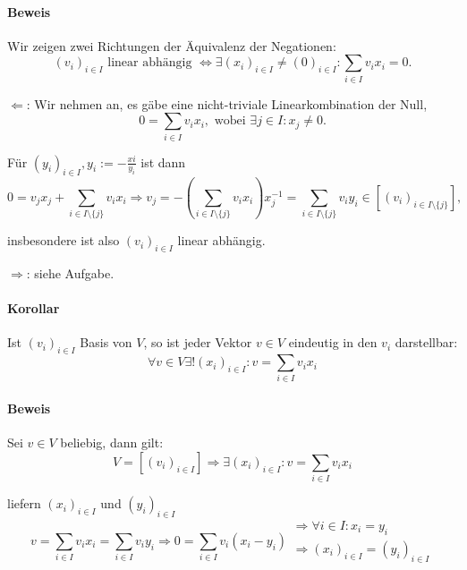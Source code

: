 \paragraph{Beweis}
	Wir zeigen zwei Richtungen der Äquivalenz der Negationen: 
	\begin{equation*}
		(v_i)_{i\in I} \text{ linear abhängig } \Leftrightarrow \exists(x_i)_{i\in I} \neq (0)_{i\in I}: \sum_{i\in I} v_ix_i = 0.
	\end{equation*}

	$\Leftarrow$: Wir nehmen an, es gäbe eine nicht-triviale Linearkombination der Null,
	\begin{equation*}
		0 = \sum_{i\in I} v_ix_i, \text{ wobei } \exists j\in I: x_j \neq 0.
	\end{equation*}

	Für $(y_i)_{i\in I}, y_i := - \frac{xi}{y_i}$ ist dann
	\begin{equation*}
		0 = v_jx_j + \sum_{i\in I\setminus\{j\}} v_ix_i \Rightarrow v_j = -\left(\sum_{i\in I\setminus\{j\}}v_ix_i\right)x_j^{-1} = \sum_{i\in I\setminus\{j\}} v_iy_i \in [(v_i)_{i\in I\setminus\{j\}}],
	\end{equation*}

	insbesondere ist also $(v_i)_{i\in I}$ linear abhängig.

	$\Rightarrow$: siehe Aufgabe.
	
\paragraph{Korollar}
	Ist $(v_i)_{i\in I}$ Basis von $ V $, so ist jeder Vektor $v\in V$ eindeutig in den $v_i$ darstellbar:
	\begin{equation*}
		\forall v\in V \exists! (x_i)_{i\in I}: v = \sum_{i\in I} v_ix_i
	\end{equation*}

\paragraph{Beweis}
	Sei $v\in V$ beliebig, dann gilt:
	\begin{equation*}
		V = [(v_i)_{i\in I}] \Rightarrow \exists (x_i)_{i\in I}: v = \sum_{i\in I} v_ix_i
	\end{equation*}

	liefern $(x_i)_{i\in I}$ und $(y_i)_{i\in I}$
	\begin{equation*}
		v = \sum_{i\in I} v_ix_i = \sum_{i\in I}v_iy_i \Rightarrow 0 = \sum_{i\in I} v_i(x_i-y_i)
		\begin{array}{l}
			\Rightarrow \forall i\in I: x_i = y_i\\
			\Rightarrow (x_i)_{i\in I} = (y_i)_{i\in I}
		\end{array}
	\end{equation*}

